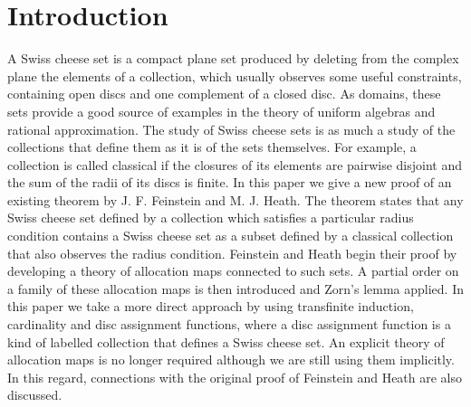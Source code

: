 \documentclass{strippedproc-l}
\theoremstyle{definition}
\theoremstyle{remark}
\numberwithin{equation}{section}
\begin{document}
\section{Introduction}
\label{sec:Intro}
A Swiss cheese set is a compact plane set produced by deleting from the complex plane the elements of a collection, which usually observes some useful constraints, containing open discs and one complement of a closed disc.  As domains, these sets provide a good source of examples in the theory of uniform algebras and rational approximation. The study of Swiss cheese sets is as much a study of the collections that define them as it is of the sets themselves. For example, a collection is called classical if the closures of its elements are pairwise disjoint and the sum of the radii of its discs is finite. In this paper we give a new proof of an existing theorem by J. F. Feinstein and M. J. Heath. The theorem states that any Swiss cheese set defined by a collection which satisfies a particular radius condition contains a Swiss cheese set as a subset defined by a classical collection that also observes the radius condition.  Feinstein and Heath begin their proof by developing a theory of allocation maps connected to such sets.  A partial order on a family of these allocation maps is then introduced and Zorn's lemma applied. In this paper we take a more direct approach by using transfinite induction, cardinality and disc assignment functions, where a disc assignment function is a kind of labelled collection that defines a Swiss cheese set. An explicit theory of allocation maps is no longer required although we are still using them implicitly.  In this regard, connections with the original proof of Feinstein and Heath are also discussed.
\end{document}
